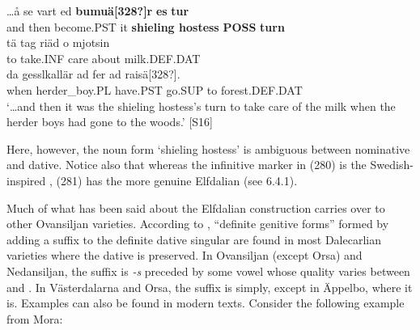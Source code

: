 

 \ea\label{}
\gll …å  se  vart  ed  \textbf{bumuä[328?]r} \textbf{es} \textbf{tur}\\


and  then  become.PST  it  \textbf{shieling hostess} \textbf{POSS} \textbf{turn}\\

 \ea\label{}
\gll tä  tag  riäd   o  mjotsin\\


to  take.INF  care  about  milk.DEF.DAT\\

 \ea\label{}
\gll da  gesslkallär  ad  fer  ad  raisä[328?].\\


when  herder\_boy.PL  have.PST  go.SUP  to  forest.DEF.DAT\\

\glt ‘…and then it was the shieling hostess’s turn to take care of the milk when the herder boys had gone to the woods.’ [S16]

\z

Here, however, the noun form  ‘shieling hostess’ is ambiguous between nominative and dative. Notice also that whereas the infinitive marker in (280) is the Swedish-inspired , (281) has the more genuine Elfdalian  (see 6.4.1). 


Much of what has been said about the Elfdalian construction carries over to other Ovansiljan varieties. According to \citet[170]{Levander1928}, “definite genitive forms” formed by adding a suffix to the definite dative singular are found in most Dalecarlian varieties where the dative is preserved. In Ovansiljan (except Orsa) and Nedansiljan, the suffix is\textit{ {}-s} preceded by some vowel whose quality varies between  and . In Västerdalarna and Orsa, the suffix is simply, except in Äppelbo, where it is. Examples can also be found in modern texts. Consider the following example from Mora:

